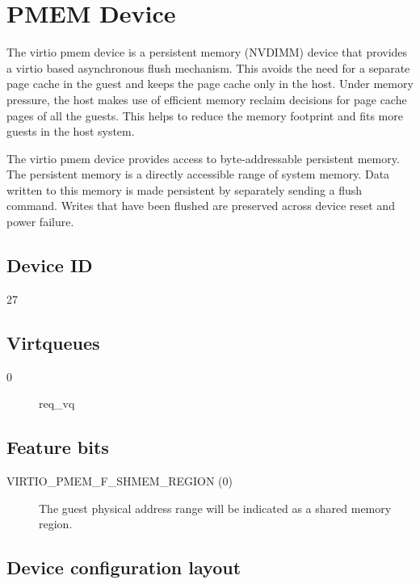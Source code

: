 \section{PMEM Device}\label{sec:Device Types / PMEM Device}

The virtio pmem device is a persistent memory (NVDIMM) device
that provides a virtio based asynchronous flush mechanism. This avoids
the need for a separate page cache in the guest and keeps the page cache
only in the host. Under memory pressure, the host makes use of
efficient memory reclaim decisions for page cache pages of all the
guests. This helps to reduce the memory footprint and fits more guests
in the host system.

The virtio pmem device provides access to byte-addressable persistent
memory. The persistent memory is a directly accessible range of system memory.
Data written to this memory is made persistent by separately sending a
flush command. Writes that have been flushed are preserved across device
reset and power failure.

\subsection{Device ID}\label{sec:Device Types / PMEM Device / Device ID}
  27

\subsection{Virtqueues}\label{sec:Device Types / PMEM Device / Virtqueues}
\begin{description}
\item[0] req_vq
\end{description}

\subsection{Feature bits}\label{sec:Device Types / PMEM Device / Feature bits}

\begin{description}
\item[VIRTIO_PMEM_F_SHMEM_REGION (0)] The guest physical address range will be
indicated as a shared memory region.
\end{description}

\subsection{Device configuration layout}\label{sec:Device Types / PMEM Device / Device configuration layout}

